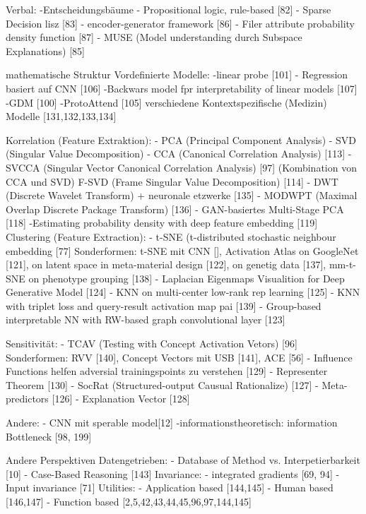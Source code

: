 Verbal:
-Entscheidungsbäume
- Propositional logic, rule-based [82]
- Sparse Decision lisz [83]
- encoder-generator framework [86]
- Filer attribute probability density function [87]
- MUSE (Model understanding durch Subspace Explanations) [85]

mathematische Struktur
Vordefinierte Modelle:
-linear probe [101]
- Regression basiert auf CNN [106]
-Backwars model fpr interpretability of linear models [107]
-GDM [100]
-ProtoAttend [105]
verschiedene Kontextspezifische (Medizin) Modelle [131,132,133,134]

Korrelation (Feature Extraktion):
- PCA (Principal Component Analysis)
- SVD (Singular Value Decomposition)
- CCA (Canonical Correlation Analysis) [113]
- SVCCA (Singular Vector Canonical Correlation Analysis) [97] (Kombination von CCA und SVD)
F-SVD (Frame Singular Value Decomposition) [114]
- DWT (Discrete Wavelet Transform) + neuronale etzwerke [135]
- MODWPT (Maximal Overlap Discrete Package Transform) [136]
- GAN-basiertes Multi-Stage PCA [118]
-Estimating probability density with deep feature embedding [119]
Clustering (Feature Extraction):
- t-SNE (t-distributed stochastic neighbour embedding [77]
Sonderformen: t-SNE mit CNN [], Activation Atlas on GoogleNet [121], on latent space in meta-material design [122], on genetig data [137], mm-t-SNE on phenotype grouping [138]
- Laplacian Eigenmaps Visualition for Deep Generative Model [124]
- KNN on multi-center low-rank rep learning [125]
- KNN with triplet loss and query-result activation map pai  [139]
- Group-based interpretable NN with RW-based graph convolutional layer [123]

Sensitivität:
- TCAV (Testing with Concept Activation Vetors) [96]
Sonderformen: RVV [140], Concept Vectors mit USB [141], ACE [56]
- Influence Functions helfen adversial trainingspoints zu verstehen [129]
- Representer Theorem [130]
- SocRat (Structured-output Causual Rationalize) [127]
- Meta-predictors [126]
- Explanation Vector [128]

Andere:
- CNN mit sperable model[12]
-informationstheoretisch: information Bottleneck [98, 199]

Andere Perspektiven
Datengetrieben:
- Database of Method vs. Interpetierbarkeit [10]
- Case-Based Reasoning [143]
Invariance:
- integrated gradients [69, 94]
-Input invariance [71]
Utilities:
- Application based [144,145]
- Human based [146,147]
- Function based [2,5,42,43,44,45,96,97,144,145]

